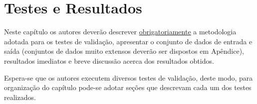 \chapter{Testes e Resultados}
\label{cap:testesResultados}

Neste capítulo os autores deverão descrever \underline{obrigatoriamente} a metodologia adotada para os testes de validação, apresentar o conjunto de dados de entrada e saída (conjuntos de dados muito extensos deverão ser dispostos em Apêndice), resultados imediatos e breve discussão acerca dos resultados obtidos.
	
Espera-se que os autores executem diversos testes de validação, deste modo, para organização do capítulo pode-se adotar seções que descrevam cada um dos testes realizados.